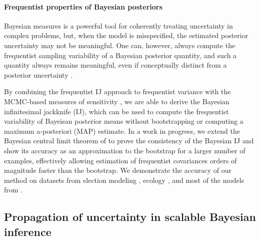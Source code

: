 \paragraph{Frequentist properties of Bayesian posteriors}

Bayesian measures is a powerful tool for coherently treating uncertainty in
complex problems, but, when the model is misspecified, the estimated  posterior
uncertainty may not be meaningful.  One can, however, always compute the
frequentist sampling variability of a Bayesian posterior quantity, and such a
quantity always remains meaningful, even if conceptually distinct from a
posterior uncertainty \citet{waddell:2002:bayesphyloboot,
kleijn:2006:misspecification, huggins:2019:bayesbag}.

By combining the frequentist IJ \citep{jaeckel:1972:infinitesimal,
shao:2012:jackknife, giordano:2019:ij} approach to frequentist variance with the
MCMC-based measures of sensitivity \citep{gustafson:2012:localrobustnessbook,
giordano:2018:covariances}, we are able to derive the Bayesian infinitesimal
jackknife (IJ), which can be used to compute the frequentist variability of
Bayeisan posterior means without bootstrapping or computing a maximum
a-posteriori (MAP) estimate.  In a work in progress, we extend the Bayesian
central limit theorem of \citet{lehman:1983:pointestimation,
kass:1990:posteriorexpansions} to prove the consistency of the Bayesian IJ and
show its accuracy as an approximation to the bootstrap for a larger number of
examples, effectively allowing estimation of frequentist covariances orders of
magnitude faster than the bootstrap.  We demonstrate the accuracy of our method
on datasets from election modeling \citep{economist:2020:election}, ecology \citep{kery:2011:bayesian}, and most of
the models from \citep{gelman:2006:arm, stan-examples:2017}.



\subsection*{Propagation of uncertainty in scalable Bayesian inference}

